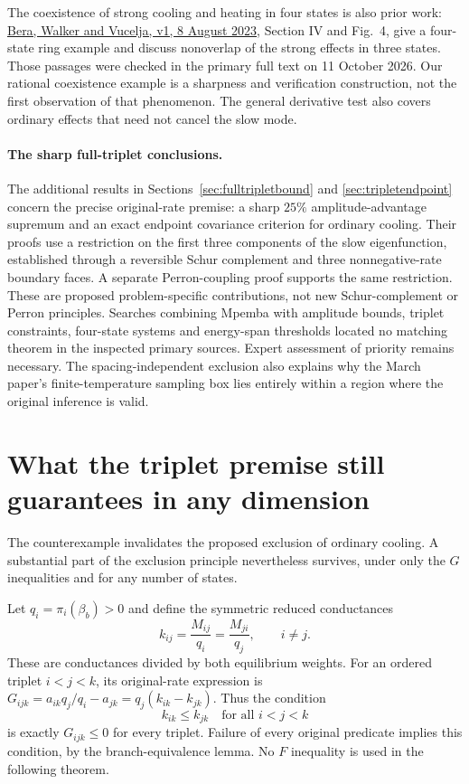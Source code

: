 \documentclass[11pt]{article}
\begin{document}
The coexistence of strong cooling and heating in four states is also prior
work: \href{https://arxiv.org/abs/2308.04557v1}{Bera, Walker and Vucelja,
v1, 8 August 2023}, Section IV and Fig.~4, give a four-state ring example and
discuss nonoverlap of the strong effects in three states. Those passages
were checked in the primary full text on 11 October 2026. Our rational
coexistence example is a sharpness and verification construction, not the
first observation of that phenomenon. The general derivative test also
covers ordinary effects that need not cancel the slow mode.

\paragraph{The sharp full-triplet conclusions.}
The additional results in Sections~\ref{sec:fulltripletbound} and
\ref{sec:tripletendpoint} concern the precise original-rate premise:
a sharp $25\%$ amplitude-advantage supremum and an exact endpoint covariance
criterion for ordinary cooling. Their proofs use a restriction on the first
three components of the slow eigenfunction, established through a reversible
Schur complement and three nonnegative-rate boundary faces. A separate
Perron-coupling proof supports the same restriction. These are proposed
problem-specific contributions, not new Schur-complement or Perron principles.
Searches combining Mpemba with amplitude bounds, triplet constraints,
four-state systems and energy-span thresholds located no matching theorem
in the inspected primary sources. Expert assessment of priority remains
necessary. The spacing-independent exclusion also explains why the March
paper's finite-temperature sampling box lies entirely within a region where
the original inference is valid.

\section{What the triplet premise still guarantees in any dimension}\label{sec:orderedconductances}
The counterexample invalidates the proposed exclusion of ordinary cooling.
A substantial part of the exclusion principle nevertheless survives, under
only the $G$ inequalities and for any number of states.

Let $q_i=\pi_i(\beta_b)>0$ and define the symmetric reduced conductances
\[
k_{ij}=\frac{M_{ij}}{q_i}=\frac{M_{ji}}{q_j},\qquad i\ne j.
\]
These are conductances divided by both equilibrium weights. For an ordered
triplet $i<j<k$, its original-rate expression is
$G_{ijk}=a_{ik}q_j/q_i-a_{jk}=q_j(k_{ik}-k_{jk})$. Thus the condition
\begin{equation}\label{eq:orderedk}
k_{ik}\leq k_{jk}\quad\text{for all }i<j<k
\end{equation}
is exactly $G_{ijk}\leq0$ for every triplet. Failure of every original
predicate implies this condition, by the branch-equivalence lemma. No
$F$ inequality is used in the following theorem.
\end{document}
